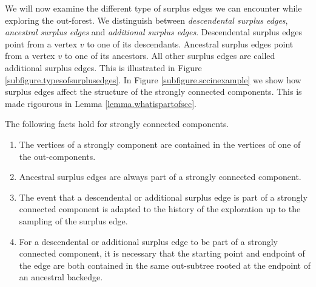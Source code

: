 We will now examine the different type of surplus edges we can encounter while exploring the out-forest. We distinguish between \emph{descendental surplus edges}, \emph{ancestral surplus edges} and \emph{additional surplus edges}. Descendental surplus edges point from a vertex $v$ to one of its descendants. Ancestral surplus edges point from a vertex $v$ to one of its ancestors. All other surplus edges are called additional surplus edges. This is illustrated in Figure \ref{subfigure.typesofsurplusedges}. In Figure \ref{subfigure.sccinexample} we show how surplus edges affect the structure of the strongly connected components. This is made rigourous in Lemma \ref{lemma.whatispartofscc}.
\begin{lemma}\label{lemma.whatispartofscc}
The following facts hold for strongly connected components. 
\begin{enumerate}
\item The vertices of a strongly component are contained in the vertices of one of the out-components.
\item Ancestral surplus edges are always part of a strongly connected component.
\item The event that a descendental or additional surplus edge is part of a strongly connected component is adapted to the history of the exploration up to the sampling of the surplus edge. 
\item For a descendental or additional surplus edge to be part of a strongly connected component, it is necessary that the starting point and endpoint of the edge are both contained in the same out-subtree rooted at the endpoint of an ancestral backedge.
\end{enumerate}
\end{lemma}
